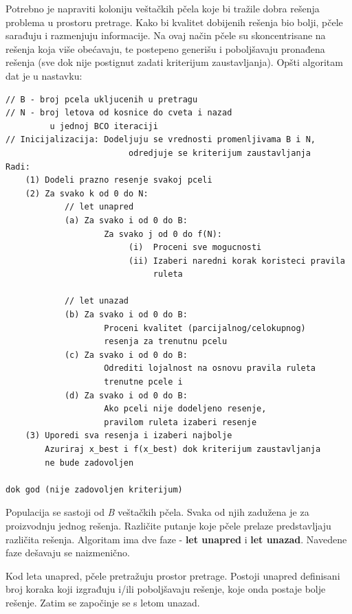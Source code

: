 \documentclass[a4paper]{article}
\begin{document}
{Potrebno je napraviti koloniju veštačkih pčela koje bi tražile dobra rešenja problema u prostoru pretrage. Kako bi kvalitet dobijenih rešenja bio bolji, pčele sarađuju i razmenjuju informacije. Na ovaj način pčele su skoncentrisane na rešenja koja više obećavaju, te postepeno generišu i poboljšavaju pronađena rešenja (sve dok nije postignut zadati kriterijum zaustavljanja).
Opšti algoritam dat je u nastavku:

\begin{lstlisting}[caption={Pseudokod {\em BCO} algoritma \cite{algoritam} },frame=single, label=simple]
// B - broj pcela ukljucenih u pretragu
// N - broj letova od kosnice do cveta i nazad 
	     u jednoj BCO iteraciji
// Inicijalizacija: Dodeljuju se vrednosti promenljivama B i N, 
		 		         odredjuje se kriterijum zaustavljanja
Radi:
    (1) Dodeli prazno resenje svakoj pceli
    (2) Za svako k od 0 do N:
    		// let unapred
    		(a) Za svako i od 0 do B:
    			    Za svako j od 0 do f(N):
    					 (i)  Proceni sve mogucnosti
    					 (ii) Izaberi naredni korak koristeci pravila 
    					      ruleta
    		
    		// let unazad
    		(b) Za svako i od 0 do B:
    			    Proceni kvalitet (parcijalnog/celokupnog) 
    			    resenja	za trenutnu pcelu
    		(c) Za svako i od 0 do B:  
    		    	Odrediti lojalnost na osnovu pravila ruleta
    		    	trenutne pcele i
		    (d) Za svako i od 0 do B:
		       		Ako pceli nije dodeljeno resenje, 
		       		pravilom ruleta izaberi resenje
    (3) Uporedi sva resenja i izaberi najbolje
        Azuriraj x_best i f(x_best) dok kriterijum zaustavljanja
        ne bude zadovoljen
    
dok god (nije zadovoljen kriterijum)
\end{lstlisting}

Populacija se sastoji od {\em B} veštačkih pčela. Svaka od njih zadužena je za proizvodnju jednog rešenja. Različite putanje koje pčele prelaze predstavljaju različita rešenja. Algoritam ima dve faze - \textbf{let unapred} i \textbf{let unazad}. Navedene faze dešavaju se naizmenično\cite{algoritam}.

Kod leta unapred, pčele pretražuju prostor pretrage. Postoji unapred definisani broj koraka koji izgrađuju i/ili poboljšavaju rešenje, koje onda postaje bolje rešenje. Zatim se započinje se s letom unazad.

}
\end{document}
